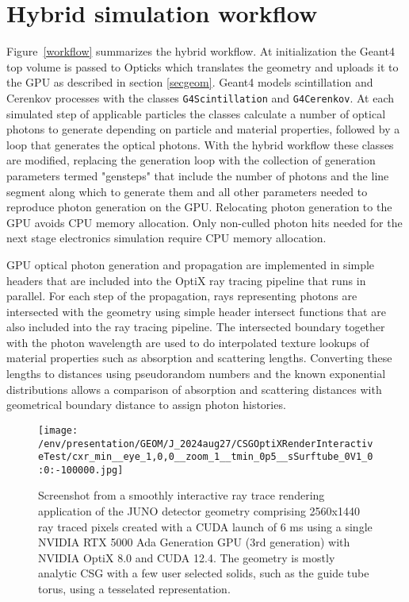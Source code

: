 \documentclass{webofc}
\begin{document}
\section{Hybrid simulation workflow}%
\label{secworkflow}%
%
Figure~\ref{workflow} summarizes the hybrid workflow. 
At initialization the Geant4 top volume is passed to Opticks
which translates the geometry and uploads it to the GPU as described in section \ref{secgeom}.
%
Geant4 models scintillation and Cerenkov processes with the classes {\tt G4Scintillation} and {\tt G4Cerenkov}. 
At each simulated step of applicable particles the classes calculate a number of optical photons 
to generate depending on particle and material properties, followed by a loop that generates the optical photons. 
With the hybrid workflow these classes are modified, replacing the generation loop with the collection of 
generation parameters termed "gensteps" that include the number of photons and the line segment along which to generate them and all
other parameters needed to reproduce photon generation on the GPU. Relocating photon generation to the
GPU avoids CPU memory allocation. Only non-culled photon hits needed for the next stage electronics 
simulation require CPU memory allocation. 

GPU optical photon generation and propagation are implemented in simple headers that are included
into the OptiX ray tracing pipeline that runs in parallel. 
For each step of the propagation, rays representing photons are intersected
with the geometry using simple header intersect functions that are also included into the ray tracing pipeline.
The intersected boundary together with the photon wavelength are used to do interpolated texture lookups of
material properties such as absorption and scattering lengths.
Converting these lengths to distances using pseudorandom numbers and 
the known exponential distributions allows a comparison of absorption and scattering distances 
with geometrical boundary distance to assign photon histories. 
%
%
\begin{figure}
\centering
%
%
\texttt{[image: /env/presentation/GEOM/J\_2024aug27/CSGOptiXRenderInteractiveTest/cxr\_min\_\_eye\_1,0,0\_\_zoom\_1\_\_tmin\_0p5\_\_sSurftube\_0V1\_0:0:-100000.jpg]}
\caption{Screenshot from a smoothly interactive ray trace rendering application of the JUNO detector geometry comprising 2560x1440 ray traced pixels created with a CUDA launch of 6 ms
using a single NVIDIA RTX 5000 Ada Generation GPU (3rd generation) with NVIDIA OptiX 8.0 and CUDA 12.4.
The geometry is mostly analytic CSG with a few user selected solids, such as the guide tube torus, using a tesselated representation.  
}    
\label{interactive}
\vspace{-5mm}
\end{figure}
%
%
\end{document}
